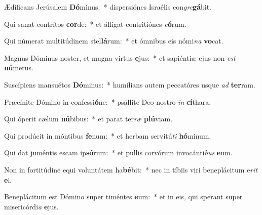 \item Ædíficans Jerúsalem \textbf{Dó}minus:~* dispersiónes Israélis con\textit{gre}\textbf{gá}bit.
\item Qui sanat contrítos \textbf{cor}de:~* et álligat contritiónes \textit{e}\textbf{ó}rum.
\item Qui númerat multitúdinem stel\textbf{lá}rum:~* et ómnibus eis nómi\textit{na} \textbf{vo}cat.
\item Magnus Dóminus noster, et magna virtus \textbf{e}jus:~* et sapiéntiæ ejus non \textit{est} \textbf{nú}merus.
\item Suscípiens mansuétos \textbf{Dó}minus:~* humílians autem peccatóres usque \textit{ad} \textbf{ter}ram.
\item Præcínite Dómino in confessi\textbf{ó}ne:~* psállite Deo nostro \textit{in} \textbf{cí}thara.
\item Qui óperit cælum \textbf{nú}bibus:~* et parat ter\textit{ræ} \textbf{plú}viam.
\item Qui prodúcit in móntibus \textbf{fe}num:~* et herbam servitú\textit{ti} \textbf{hó}minum.
\item Qui dat juméntis escam ip\textbf{só}rum:~* et pullis corvórum invocánti\textit{bus} \textbf{e}um.
\item Non in fortitúdine equi voluntátem ha\textbf{bé}bit:~* nec in tíbiis viri beneplácitum e\textit{rit} \textbf{e}i.
\item Beneplácitum est Dómino super timéntes \textbf{e}um:~* et in eis, qui sperant super misericórdi\textit{a} \textbf{e}jus.
